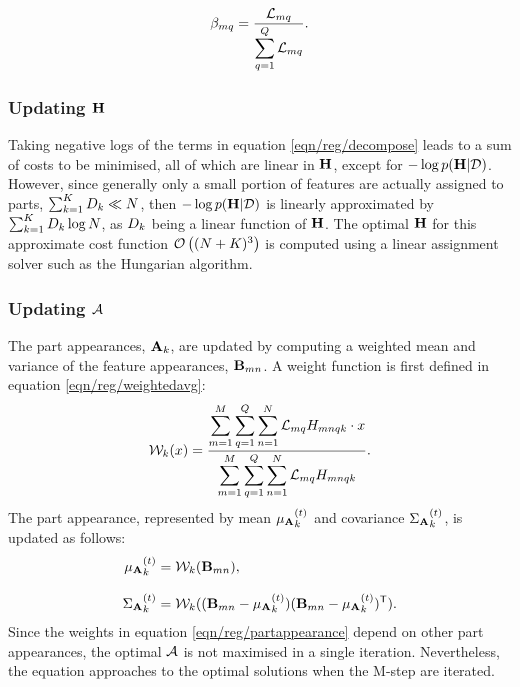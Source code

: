 \begin{equation}
{\beta}_{mq} = 
\frac{\mathcal{L}_{mq}}{\displaystyle\sum_{q = 1}^{Q} \mathcal{L}_{mq}}.
\end{equation}

\subsubsection{Updating $\mathbf{H}$}
Taking negative logs of the terms in equation \ref{eqn/reg/decompose} leads to a sum of costs to be minimised, all of which are linear in $\mathbf{H}$, except for $-\log p(\mathbf{H}|\mathcal{D})$. 
However, since generally only a small portion of features are actually assigned to parts, \ie $\sum_{k=1}^{K}{D}_k \ll N$, then $-\log p(\mathbf{H}|\mathcal{D})$ is linearly approximated by $\sum_{k=1}^{K}{D}_k\log N$,  as ${D}_k$ being a linear function of $\mathbf{H}$. The optimal $\mathbf{H}$ for this approximate cost function $\mathcal{O}\left((N + K)^3\right)$ is computed using a linear assignment solver such as the Hungarian algorithm.  

\subsubsection{Updating $\mathcal{A}$}
The part appearances, $\mathbf{A}_k$, are updated by computing a weighted mean and variance of the feature appearances, $\mathbf{B}_{mn}$. A weight function is first defined in equation \ref{eqn/reg/weightedavg}:
\begin{equation}
	\mathcal{W}_k(x) = \frac{\displaystyle\sum_{m=1}^M \displaystyle\sum_{q = 1}^{Q} \displaystyle\sum_{n=1}^{N}\mathcal{L}_{mq}{H}_{mnqk} \cdot x}{\displaystyle\sum_{m=1}^M \displaystyle\sum_{q = 1}^{Q} \displaystyle\sum_{n=1}^{N}\mathcal{L}_{mq}{H}_{mnqk}}.
	\label{eqn/reg/weightedavg} 
\end{equation}
The part appearance, represented by mean ${\mu_{\mathbf{A}}}_{k}^{(t)}$ and covariance ${\Sigma_{\mathbf{A}}}_{k}^{(t)}$, is updated as follows:  
\begin{equation}
	\begin{aligned}
		{\mu_{\mathbf{A}}}_{k}^{(t)} & = \mathcal{W}_k(\mathbf{B}_{mn}), \\[3mm]  
		{\Sigma_{\mathbf{A}}}_{k}^{(t)} & = \mathcal{W}_k((\mathbf{B}_{mn} - {\mu_{\mathbf{A}}}_{k}^{(t)})(\mathbf{B}_{mn} - {\mu_{\mathbf{A}}}_{k}^{(t)})^{\textsf{T}}).
	\end{aligned}
	\label{eqn/reg/partappearance}
\end{equation}
Since the weights in equation \ref{eqn/reg/partappearance} depend on other part appearances, the optimal $\mathcal{A}$ is not maximised in a single iteration. Nevertheless, the equation approaches to the optimal solutions when the M-step are iterated. 

